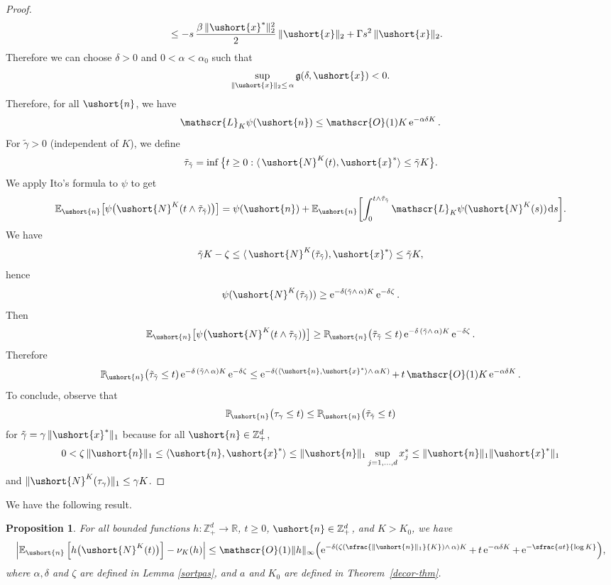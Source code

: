 \documentclass[10pt]{amsart}
\newcommand{\Psfrac}[2]{(\sfrac{#1}{#2})}
\newcommand{\scaleto}[2]{#1}
\let\mathcal\mathscr
\numberwithin{equation}{section}
\theoremstyle{plain}
\newtheorem{proposition}[theorem]{Proposition}
\theoremstyle{definition}
\newcommand{\proba}{{\mathbb{P}}}
\newcommand{\E}{{\mathbb{E}}}
\newcommand{\real}{\mathbb{R}}
\newcommand{\zentiers}{{\mathbb{Z}}}
\newcommand{\domaine}{\zentiers_{+}^{d}}
\newcommand{\Oun}{\mathcal{O}(1)}
\newcommand{\sK}{K}
\newcommand{\gen}{\mathscr{L}_{\sK}}
\newcommand{\vecn}{\ushort{n}}
\newcommand{\vecxf}{\ushort{x}^*}
\newcommand{\vecx}{\ushort{x}}
\newcommand{\leproc}{\ushort{N}^{K}}
\newcommand{\nuk}{\nu_{K}}\let\snuk\nuk
\newcommand{\e}{\operatorname{e}}
\newcommand{\dd}{\hspace{1pt}\mathrm{d}}
\newcommand{\norm}[1]{\|#1\|_{1}}\let\snorm\norm
\newcommand{\normdeux}[1]{\|#1\|_{2}}\let\snormdeux\normdeux
\begin{document}
\begin{proof}
\begin{align*}
& \le -s\,\frac{\beta\,\normdeux{\vecxf}^{2}}{2}\,\normdeux{\vecx} +\Gamma s^{2}\, \normdeux{\vecx}.
\end{align*}
Therefore we can choose $\delta>0$ and $0<\alpha<\alpha_0$ such that
\[
\sup_{\snormdeux{\vecx}\le\, \alpha}\mathfrak{g}(\delta,\vecx)<0.
\]
Therefore, for all $\vecn$, we have
\[
\gen \psi(\vecn)\le \Oun K \e^{-\alpha\delta K}.
\]
For $\tilde{\gamma}>0$ (independent of $K$), we define
\[
\tilde{\tau}_{\tilde \gamma}=\inf\big\{t\geq 0 : \langle\, \leproc(t),\vecxf\rangle\le \tilde \gamma K\big\}.
\]
We apply Ito's formula to $\psi$ to get
\[
\E_{\vecn}\bigl[\psi\bigl(\leproc(t\wedge\tilde{\tau}_{\tilde \gamma})\bigr)\bigr]
=\psi(\vecn)+\E_{\vecn}\biggl[\int_{0}^{t\wedge\tilde{\tau}_{\tilde \gamma}}\gen\psi(\leproc(s))\dd s\biggr].
\]
We have
\[
\tilde{\gamma}K-\zeta \leq \langle\, \leproc(\tilde{\tau}_{\tilde \gamma}),\vecxf\rangle \leq \tilde{\gamma} K,
\]
hence
\[
\psi(\leproc(\tilde{\tau}_{\tilde \gamma}))\geq \e^{-\delta(\tilde{\gamma}\wedge\, \alpha)K} \e^{-\delta \zeta}.
\]
Then
\[
\E_{\vecn}\bigl[\psi\bigl(\leproc(t\wedge\tilde{\tau}_{\tilde \gamma})\bigr)\bigr]
\geq \proba_{\!\vecn}\bigl(\tilde{\tau}_{\tilde \gamma}\leq t)\e^{-\delta\,(\tilde \gamma\wedge\, \alpha) K}\e^{-\delta \zeta}.
\]
Therefore
\[
\proba_{\!\vecn}\bigl(\tilde{\tau}_{\tilde \gamma}\leq t)\e^{-\delta\,(\tilde \gamma\wedge\,\alpha) K}\e^{-\delta \zeta}
\le \e^{-\delta(\langle \vecn,\vecxf\rangle \wedge\,\alpha K)}+\,t\, \Oun K \e^{-\alpha\delta K}.
\]
To conclude, observe that
\[
\proba_{\!\vecn}\bigl(\tau_{\gamma}\leq t)
\leq
\proba_{\!\vecn}\bigl(\tilde{\tau}_{\tilde \gamma}\leq t)
\]
for $\tilde{\gamma}=\gamma\, \norm{\vecxf}$ because for all $\vecn\in\domaine$,
\[
0<\zeta\, \norm{\vecn} \leq \langle \vecn,\vecxf \rangle
\leq \norm{\vecn}\sup_{j=1,\ldots,d} x^*_{j} \leq \norm{\vecn} \|\vecxf\|_1
\]
and $\| \leproc(\tau_{\gamma})\|_1\leq \gamma K$.
\end{proof}

We have the following result.

\begin{proposition}
\label{pre-theorem-ergodic}
For all bounded functions $h:\domaine\to\real$, $t\ge 0$, $\vecn\in \domaine$, and $K>K_{0}$, we have
\[
\left|\E_{\vecn}\left[h\bigl(\leproc(t)\bigr)\right]-\nuk(h)\right|
\le \Oun \|h\|_{\scaleto{\infty}{3pt}}\Bigl(\e^{-\delta\left(\zeta\Psfrac{\|\vecn\|_{1}}{K}\wedge\,\alpha\right) K}
+\, t \e^{-\alpha\delta K}+\e^{-\sfrac{a t}{\log K}}\Bigr),
\]
where $\alpha, \delta$ and $\zeta$ are defined in Lemma \ref{sortpas}, and $a$ and $K_0$ are defined in Theorem~\ref{decor-thm}.
\end{proposition}
\end{document}
